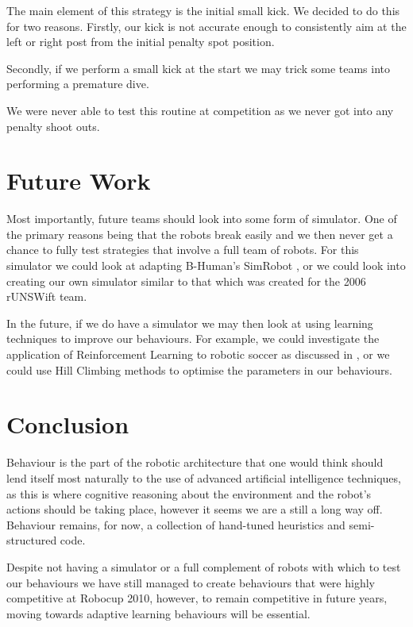 \documentclass[pdftex,11pt,a4paper]{report}
\begin{document}
The main element of this strategy is the initial small kick. We decided to do this for two reasons. Firstly, our kick is not accurate enough to consistently aim at the left or right post from the initial penalty spot position.

Secondly, if we perform a small kick at the start we may trick some teams into performing a premature dive.

We were never able to test this routine at competition as we never got into any penalty shoot outs.

\section{Future Work}
Most importantly, future teams should look into some form of simulator. One of the primary reasons being that the robots break easily and we then never get a chance to fully test strategies that involve a full team of robots. For this simulator we could look at adapting B-Human's SimRobot \cite{thomas09code}, or we could look into creating our own simulator similar to that which was created for the 2006 rUNSWift team. \cite{huangthesis}

In the future, if we do have a simulator we may then look at using learning techniques to improve our behaviours. For example, we could investigate the application of Reinforcement Learning to robotic soccer as discussed in \cite{Riley:thesis}, or we could use Hill Climbing methods to optimise the parameters in our behaviours.

\section{Conclusion}
Behaviour is the part of the robotic architecture that one would think should lend itself most naturally to the use of advanced artificial intelligence techniques, as this is where cognitive reasoning about the environment and the robot's actions should be taking place, however it seems we are a still a long way off. Behaviour remains, for now, a collection of hand-tuned heuristics and semi-structured code. 

Despite not having a simulator or a full complement of robots with which to test our behaviours we have still managed to create behaviours that were highly competitive at Robocup 2010, however, to remain competitive in future years, moving towards adaptive learning behaviours will be essential.

\newpage
\end{document}

